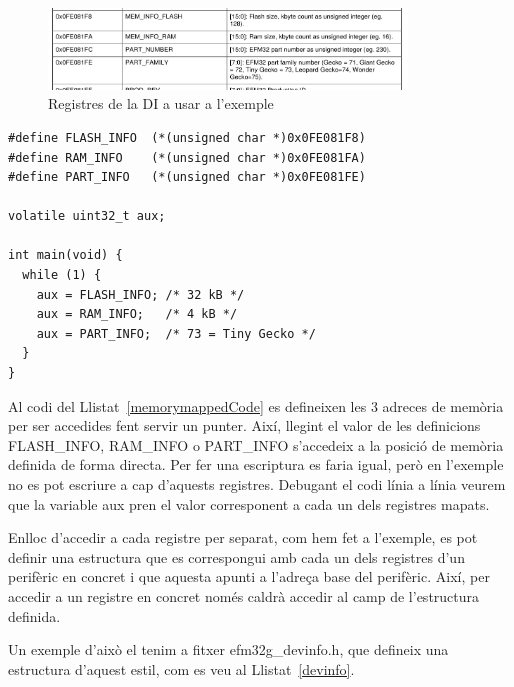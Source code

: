 \begin{figure}
 \centering
 \includegraphics[width=0.85\textwidth, keepaspectratio]{imatges/DI_Table_RM.png}
 \caption{Registres de la DI a usar a l'exemple \cite[24]{EFM32GRM}}
 \label{fig:EFM32_DI}
\end{figure}



\begin{lstlisting}[frame=single,caption={Accedint a memòria en C},label=memorymappedCode,style=customc]
#define FLASH_INFO  (*(unsigned char *)0x0FE081F8)
#define RAM_INFO    (*(unsigned char *)0x0FE081FA)
#define PART_INFO   (*(unsigned char *)0x0FE081FE)

volatile uint32_t aux;

int main(void) {
  while (1) {
    aux = FLASH_INFO; /* 32 kB */
    aux = RAM_INFO;   /* 4 kB */
    aux = PART_INFO;  /* 73 = Tiny Gecko */
  }
}
\end{lstlisting}

Al codi del Llistat~\ref{memorymappedCode} es defineixen les 3 adreces de memòria per ser accedides fent servir un punter. Així, llegint el valor de les definicions FLASH\_INFO, RAM\_INFO o PART\_INFO s’accedeix a la posició de memòria definida de forma directa. Per fer una escriptura es faria igual, però en l'exemple no es pot escriure a cap d'aquests registres. Debugant el codi línia a línia veurem que la variable aux pren el valor corresponent a cada un dels registres mapats.

Enlloc d'accedir a cada registre per separat, com hem fet a l'exemple, es pot definir una estructura que es correspongui amb cada un dels registres d’un perifèric en concret i que aquesta apunti a l'adreça base del perifèric. Així, per accedir a un registre en concret només caldrà accedir al camp de l'estructura definida.

Un exemple d'això el tenim a fitxer efm32g\_devinfo.h, que defineix
una estructura d'aquest estil, com es veu al Llistat~\ref {devinfo}.

